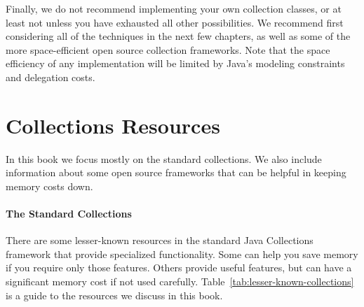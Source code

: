 Finally, we do not recommend implementing your own collection classes,
or at least not unless you have exhausted all other possibilities. 
We recommend first considering
all of the techniques in the next few chapters, as well as 
some of the more space-efficient open source collection frameworks. Note that
the space efficiency of any implementation will be limited by
Java's modeling constraints and delegation costs.

\section{Collections Resources}

In this book we focus
mostly on the standard collections. We also include information 
about some open source frameworks that can be helpful in keeping
memory costs down.


\paragraph{The Standard Collections} There are some
lesser-known resources in the standard Java Collections framework that provide specialized functionality. Some can help you
save memory if you require only those features.  Others provide useful
features, but can have a significant memory cost if not used carefully.
Table~\ref{tab:lesser-known-collections} is a guide to the resources we discuss
in this book.

